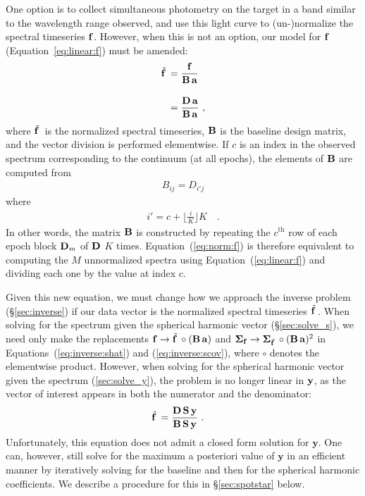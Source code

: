 \documentclass[modern]{aastex631}
\begin{document}
One option is to collect simultaneous photometry on the target in a band similar to the wavelength range observed, and use this light curve to (un-)normalize the spectral timeseries ${\mathbf{f}}$. 
However, when this is not an option, our model for ${\mathbf{f}}$ (Equation~\ref{eq:linear:f}) must be amended:
%
\begin{align}
    \label{eq:norm:f}
    \tilde{{\mathbf{f}}\hspace{0.2em}}
     & =
     \frac{
        \mathbf{f}
    } {
        {\mathbf{B}}
        \,
        {\mathbf{a}}
    }
    \nonumber 
    \\[1em]
    & =
    \frac{
        {\mathbf{D}}
        \,
        {\mathbf{a}}
    } {
        {\mathbf{B}}
        \,
        {\mathbf{a}}
    }
    \hskip 0.33em,
\end{align}
%
where $\tilde{{\mathbf{f}}\hspace{0.2em}}$ is the normalized spectral timeseries, ${\mathbf{B}}$ is the baseline design matrix, and the vector division is performed elementwise. 
If $c$ is an index in the observed spectrum corresponding to the continuum (at all epochs), the elements of ${\mathbf{B}}$ are computed from
%
\begin{align}
    B_{ij} = D_{i'j}
\end{align}
%
where
%
\begin{align}
    i' = c + \bigg\lfloor\frac{i}{K}\bigg\rfloor K
    \quad.
\end{align}
%
In other words, the matrix ${\mathbf{B}}$ is constructed by repeating the $c^\mathrm{th}$ row of each epoch block ${\mathbf{D}}_m$ of ${\mathbf{D}}$ $K$ times.
Equation~(\ref{eq:norm:f}) is therefore equivalent to computing the $M$ unnormalized spectra using Equation~(\ref{eq:linear:f}) and dividing each one by the value at index $c$.


Given this new equation, we must change how we approach the inverse problem (\S\ref{sec:inverse}) if our data vector is the normalized spectral timeseries $\tilde{{\mathbf{f}}\hspace{0.2em}}$. 
When solving for the spectrum given the spherical harmonic vector (\S\ref{sec:solve_s}), we need only make the replacements 
%
${\mathbf{f}} \rightarrow \tilde{{\mathbf{f}}\hspace{0.2em}} \circ ({\mathbf{B}}\, {\mathbf{a}})$ 
%
and 
%
$\boldsymbol{\Sigma}_\mathbf{f} \rightarrow \boldsymbol{\Sigma}_{\tilde{{\mathbf{f}}\hspace{0.2em}}} \circ ({\mathbf{B}}\, {\mathbf{a}})^2$ 
%
in Equations~(\ref{eq:inverse:shat}) and (\ref{eq:inverse:scov}), where $\circ$ denotes the elementwise product.
However, when solving for the spherical harmonic vector given the spectrum (\ref{sec:solve_y}), the problem is no longer linear in ${\mathbf{y}}$, as the vector of interest appears in both the numerator and the denominator:
%
\begin{align}
    \label{eq:norm:fy}
    \tilde{{\mathbf{f}}\hspace{0.2em}}
     & =
    \frac{
        {\mathbf{D}}
        \,
        {\mathbf{S}}
        \,
        {\mathbf{y}}
    }{
        {\mathbf{B}}
        \,
        {\mathbf{S}}
        \,
        {\mathbf{y}}
    }
    \hskip 0.33em.
\end{align}
%
Unfortunately, this equation does not admit a closed form solution for $\mathbf{y}$. 
One can, however, still solve for the maximum a posteriori value of $\mathbf{y}$ in an efficient manner by iteratively solving for the baseline and then for the spherical harmonic coefficients.
We describe a procedure for this in \S\ref{sec:spotstar} below.
\end{document}
